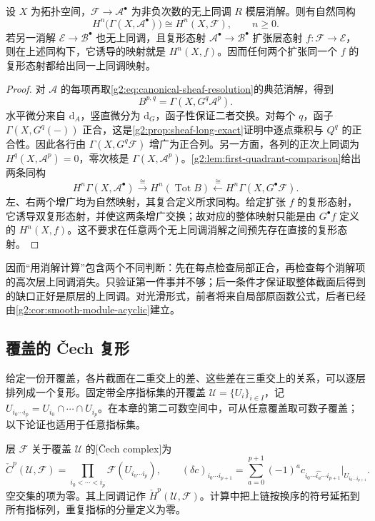 \begin{theorem}\label{g2:thm:acyclic-resolution}
	设 \(X\) 为拓扑空间，\(\mathcal F\to\mathcal A^\bullet\) 为非负次数的无上同调 \(R\) 模层消解。则有自然同构
	\[
		H^n\bigl(\Gamma(X,\mathcal A^\bullet)\bigr)\cong H^n(X,\mathcal F),\qquad n\ge0.
	\]
	若另一消解 \(\mathcal E\to\mathcal B^\bullet\) 也无上同调，且复形态射 \(\mathcal A^\bullet\to\mathcal B^\bullet\) 扩张层态射 \(f:\mathcal F\to\mathcal E\)，则在上述同构下，它诱导的映射就是 \(H^n(X,f)\)。因而任何两个扩张同一个 \(f\) 的复形态射都给出同一上同调映射。
\end{theorem}
\begin{proof}
	对 \(\mathcal A\) 的每项再取\cref{g2:eq:canonical-sheaf-resolution}的典范消解，得到
	\[
		B^{p,q}=\Gamma(X,G^q\mathcal A^p).
	\]
	水平微分来自 \(\mathrm d_A\)，竖直微分为 \(\mathrm d_G\)，函子性保证二者交换。对每个 \(q\)，函子 \(\Gamma(X,G^q(-))\) 正合，这是\cref{g2:prop:sheaf-long-exact}证明中逐点乘积与 \(Q^q\) 的正合性。因此各行由 \(\Gamma(X,G^q\mathcal F)\) 增广为正合列。另一方面，各列的正次上同调为 \(H^q(X,\mathcal A^p)=0\)，零次核是 \(\Gamma(X,\mathcal A^p)\)。\cref{g2:lem:first-quadrant-comparison}给出两条同构
	\[
		H^n\Gamma(X,\mathcal A^\bullet)
		\xrightarrow{\ \cong\ }H^n(\operatorname{Tot}B)
		\xleftarrow{\ \cong\ }H^n\Gamma(X,G^\bullet\mathcal F).
	\]
	左、右两个增广均为自然映射，其复合定义所求同构。给定扩张 \(f\) 的复形态射，它诱导双复形态射，并使这两条增广交换；故对应的整体映射只能是由 \(G^\bullet f\) 定义的 \(H^n(X,f)\)。这不要求在任意两个无上同调消解之间预先存在直接的复形态射。
\end{proof}

因而“用消解计算”包含两个不同判断：先在每点检查局部正合，再检查每个消解项的高次层上同调消失。只验证第一件事并不够；后一条件才保证取整体截面后得到的缺口正好是原层的上同调。对光滑形式，前者将来自局部原函数公式，后者已经由\cref{g2:cor:smooth-module-acyclic}建立。

\subsection{覆盖的 Čech 复形}
\label{g2:subsec:0702:02}
给定一份开覆盖，各片截面在二重交上的差、这些差在三重交上的关系，可以逐层排列成一个复形。固定带全序指标集的开覆盖 \(\mathcal U=\{U_i\}_{i\in I}\)，记 \(U_{i_0\cdots i_p}=U_{i_0}\cap\cdots\cap U_{i_p}\)。在本章的第二可数空间中，可从任意覆盖取可数子覆盖；以下论证也适用于任意指标集。

\begin{definition}\label{g2:def:cech-complex}
	层 \(\mathcal F\) 关于覆盖 \(\mathcal U\) 的[Čech complex]为
	\[
		\check C^p(\mathcal U,\mathcal F)=\prod_{i_0<\cdots<i_p}\mathcal F(U_{i_0\cdots i_p}),\qquad
		(\delta c)_{i_0\cdots i_{p+1}}=\sum_{a=0}^{p+1}(-1)^a c_{i_0\cdots\widehat{i_a}\cdots i_{p+1}}|_{U_{i_0\cdots i_{p+1}}}.
	\]
	空交集的项为零。其上同调记作 \(\check H^p(\mathcal U,\mathcal F)\)。计算中把上链按换序的符号延拓到所有指标列，重复指标的分量定义为零。
\end{definition}

